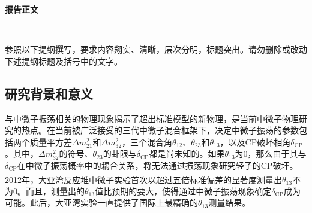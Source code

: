 \documentclass[a4paper,zihao=-4]{article}
\newcommand{\citess}[1]{\textsuperscript{\cite{#1}}}
\begin{document}
\songti

\setlength{\abovedisplayskip}{0pt}
\setlength{\belowdisplayskip}{0pt}

\begin{center}
	{\kaishu {} \textbf{报告正文} \vspace{-3ex}}
\end{center}  

\thispagestyle{empty} 　　　%


{\kaishu {}参照以下提纲撰写，要求内容翔实、清晰，层次分明，标题突出。}\alert{请勿删除或改动下述提纲标题及括号中的文字。\vspace{9bp}}



\subsection{研究背景和意义}
与中微子振荡相关的物理现象揭示了超出标准模型的新物理，是当前中微子物理研究的热点。在当前被广泛接受的三代中微子混合框架下，决定中微子振荡的参数包括两个质量平方差$\Delta m_{21}^2$和$\Delta m_{32}^2$，三个混合角$\theta_{12}$、$\theta_{23}$和$\theta_{13}$，以及CP破坏相角$\delta_{\text{CP}}$。其中，$\Delta m_{32}^2$的符号、$\theta_{23}$的卦限与$\delta_{\text{CP}}$都是尚未知的。如果$\theta_{13}$为0，那么由于其与$\delta_{\text{CP}}$在中微子振荡概率中的耦合关系，将无法通过振荡现象研究轻子的CP破坏。2012年，大亚湾反应堆中微子实验\citess{DayaBay:2012fng}首次以超过五倍标准偏差的显著度测量出$\theta_{13}$不为0。而且，测量出的$\theta_{13}$值比预期的要大，使得通过中微子振荡现象确定$\delta_{\text{CP}}$成为可能。此后，大亚湾实验一直提供了国际上最精确的$\theta_{13}$测量结果。
\end{document}
